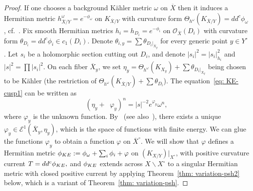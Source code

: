 \documentclass[a4paper, 11pt]{amsart}
\theoremstyle{plain}
\numberwithin{equation}{section} %
\numberwithin{figure}{section} %
\theoremstyle{plain}
\theoremstyle{plain}
\theoremstyle{plain}
\theoremstyle{plain}
\theoremstyle{remark}
\theoremstyle{definition}
\theoremstyle{definition}
\DeclareMathOperator \ddc{\textrm{dd}^c}
\begin{document}
\begin{proof}
If one chooses a background K\"ahler metric $\omega$ on $\overline{X} $ then it induces a Hermitian metric $h^\omega_{\overline{X}/Y}=e^{-\phi_\omega}$ on $K_{\overline{X}/Y}$ with curvature form { $\Theta_{h^\omega}(K_{\overline{X}/Y})=dd^c \phi_\omega$}, cf.~\cite[\S 3.1]{paun17-relative-nef}. 
Fix smooth Hermitian metrics $h_i=h_{D_i}=e^{-\phi_i}$ on $\mathcal{O}_{\overline{X}}(D_i)$ with curvature form $\theta_{D_i}=dd^c\phi_i\in c_1(D_i)$. Denote $\theta_{i,y}=\sum\theta_{D_i|_{\overline{X}_y}}$ for every generic point $y\in Y^\circ$. Let $s_i$ be a holomorphic section cutting out $D_i$, and denote $|s_i|^2=|s_i|^2_{h_i}$ and $|s|^2=\prod|s_i|^2 $. 
On each fiber $\overline{X}_y$, we set $\eta_y=\Theta_{h^\omega}(K_{X_y})+\sum\theta_{D_i|_{X_y}}$ being chosen to be K\"ahler (the restriction of $\Theta_{h^\omega}(K_{\overline{X}/Y})+\sum\theta_{D_i}$).
The equation~\eqref{eq: KE-cusp1} can be written as
\begin{equation}
    \label{eq: cusp-MA} (\eta_y+\ddc\varphi_y)^n=|s|^{-2}{e^{\varphi_y}\omega^n},
\end{equation} where $\varphi_y$ is the unknown function. By~\cite[Theorem 4.2]{Berman-Guenancia14-logcanonical} (see also~\cite[Theorem 1.2]{dang2023kahler}), there exists a unique $\varphi_y\in \mathcal{E}^1(\overline {X}_y,\eta_y)$, which is the space of functions with finite energy. {We can glue the functions $\varphi_y$ to obtain a function $\varphi$ on $\overline{X}^\circ$. We will show that $\varphi$ defines a   Hermitian metric $\phi_{\rm KE}:= \phi_\omega+\sum_i\phi_i+ \varphi$ on  $(K_{X/Y})|_{X^\circ}$, with positive curvature current $T=dd^c\phi_{\rm KE},$ and $\phi_{\rm KE}$ extends across $X\backslash X^\circ$ to a singular Hermitian metric with closed positive current by applying Theorem~\ref{thm: variation-psh2} below, which is a variant of Theorem~\ref{thm: variation-psh}.}

\end{proof}
\end{document}
